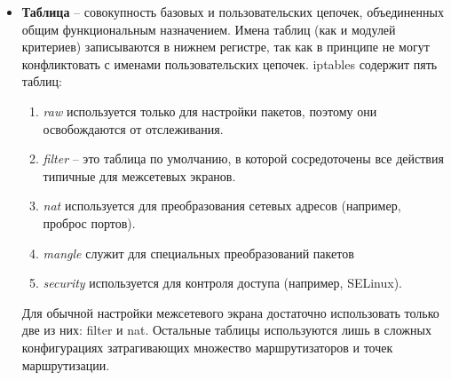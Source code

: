 \documentclass[a4paper]{article}
\begin{document}
	\begin{itemize}
		\item \textbf{Таблица} -- совокупность базовых и пользовательских цепочек, объединенных общим функциональным назначением. Имена таблиц (как и модулей критериев) записываются в нижнем регистре, так как в принципе не могут конфликтовать с именами пользовательских цепочек. iptables содержит пять таблиц:
			\begin{enumerate}
				\item 
				\emph{raw} используется только для настройки пакетов, поэтому они освобождаются от отслеживания.
				\item 
				\emph{filter} -- это таблица по умолчанию, в которой сосредоточены все действия типичные для межсетевых экранов.
				\item 
				\emph{nat} используется для преобразования сетевых адресов (например, проброс портов).
				\item
				\emph{mangle} служит для специальных преобразований пакетов
				\item
				\emph{security} используется для контроля доступа (например, SELinux).
			\end{enumerate}	
			Для обычной настройки межсетевого экрана достаточно использовать только две из них: filter и nat. Остальные таблицы используются лишь в сложных конфигурациях затрагивающих множество маршрутизаторов и точек маршрутизации.


\end{itemize}
\end{document}
